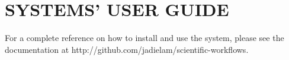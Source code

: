 \chapter{SYSTEMS' USER GUIDE}
\newpage
\label{app:workflows_generator_user_guide}
For a complete reference on how to install and use the system, please see the documentation at http://github.com/jadielam/scientific-workflows.

